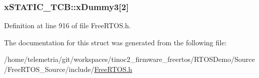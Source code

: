 \subsubsection[{\texorpdfstring{x\+Dummy3}{xDummy3}}]{ x\+S\+T\+A\+T\+I\+C\+\_\+\+T\+C\+B\+::x\+Dummy3\mbox{[}2\mbox{]}}\hypertarget{structx_s_t_a_t_i_c___t_c_b_a7f182aa8f5003494f63d975dabcb3ec1}{}\label{structx_s_t_a_t_i_c___t_c_b_a7f182aa8f5003494f63d975dabcb3ec1}


Definition at line 916 of file Free\+R\+T\+O\+S.\+h.



The documentation for this struct was generated from the following file\+:\begin{DoxyCompactItemize}
\item 
/home/telemetria/git/workspaces/tinoc2\+\_\+firmware\+\_\+freertos/\+R\+T\+O\+S\+Demo/\+Source/\+Free\+R\+T\+O\+S\+\_\+\+Source/include/\hyperlink{_free_r_t_o_s_8h}{Free\+R\+T\+O\+S.\+h}\end{DoxyCompactItemize}
